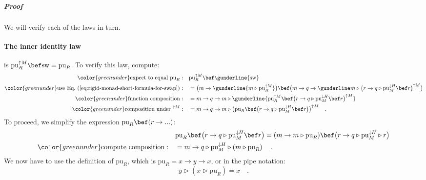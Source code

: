 \subparagraph{Proof}

We will verify each of the laws in turn.

\paragraph{The inner identity law}

is $\text{pu}_{R}^{\uparrow M}\bef\text{sw}=\text{pu}_{R}$. To verify
this law, compute:
\begin{align}
{\color{greenunder}\text{expect to equal }\text{pu}_{R}:}\quad & \text{pu}_{R}^{\uparrow M}\bef\gunderline{\text{sw}}\nonumber \\
{\color{greenunder}\text{use Eq.~(\ref{eq:rigid-monad-short-formula-for-swap})}:}\quad & =\big(m\rightarrow\gunderline{m\triangleright\text{pu}_{R}^{\uparrow M}}\big)\bef\big(m\rightarrow q\rightarrow\gunderline m\triangleright\big(r\rightarrow q\triangleright\text{pu}_{M}^{\downarrow H}\bef r\big)^{\uparrow M}\big)\nonumber \\
{\color{greenunder}\text{function composition}:}\quad & =m\rightarrow q\rightarrow m\triangleright\gunderline{\text{pu}_{R}^{\uparrow M}\bef\big(r\rightarrow q\triangleright\text{pu}_{M}^{\downarrow H}\bef r\big)^{\uparrow M}}\nonumber \\
{\color{greenunder}\text{composition under }^{\uparrow M}:}\quad & =m\rightarrow q\rightarrow m\triangleright\big(\text{pu}_{R}\bef\big(r\rightarrow q\triangleright\text{pu}_{M}^{\downarrow H}\bef r\big)\big)^{\uparrow M}\quad.\label{eq:swap-laws-derivation1a}
\end{align}
To proceed, we simplify the expression $\text{pu}_{R}\bef(r\rightarrow...)$:
\begin{align}
 & \text{pu}_{R}\bef\big(r\rightarrow q\triangleright\text{pu}_{M}^{\downarrow H}\bef r\big)=(m\rightarrow m\triangleright\text{pu}_{R})\bef\big(r\rightarrow q\triangleright\text{pu}_{M}^{\downarrow H}\triangleright r\big)\nonumber \\
{\color{greenunder}\text{compute composition}:}\quad & =m\rightarrow q\triangleright\text{pu}_{M}^{\downarrow H}\triangleright\left(m\triangleright\text{pu}_{R}\right)\quad.\label{eq:swap-laws-derivation1}
\end{align}
We now have to use the definition of $\text{pu}_{R}$, which is $\text{pu}_{R}=x\rightarrow y\rightarrow x$,
or in the pipe notation:
\begin{equation}
y\triangleright\left(x\triangleright\text{pu}_{R}\right)=x\quad.\label{eq:rigid-monad-pure-t-simplification-1}
\end{equation}
